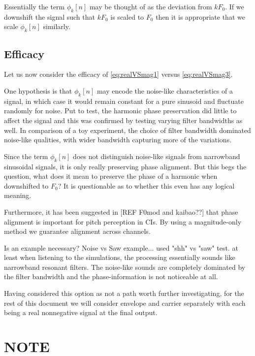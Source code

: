 \documentclass [11pt, proquest] {uwthesis}[2015/03/03]
\begin{document}
Essentially the term $\phi_k[n]$ may be thought of as the deviation from $kF_0$.  If we downshift the signal such that $kF_0$ is scaled to $F_0$ then it is appropriate that we scale $\phi_k[n]$ similarly.

\subsection{Efficacy}

Let us now consider the efficacy of \ref{eq:realVSmag1} versus  \ref{eq:realVSmag3}.

One hypothesis is that $\phi_k[n]$ may encode the noise-like characteristics of a signal, in which case it would remain constant for a pure sinusoid and fluctuate randomly for noise.  Put to test, the harmonic phase preservation did little to affect the signal and this was confirmed by testing varying filter bandwidths as well.  In comparison of a toy experiment, the choice of filter bandwidth dominated noise-like qualities, with wider bandwidth capturing more of the variations.

Since the term $\phi_k[n]$ does not distinguish noise-like signals from narrowband sinusoidal signals, it is only really preserving phase alignment.  But this begs the question, what does it mean to preserve the phase of a harmonic when downshifted to $F_0$?  It is questionable as to whether this even has any logical meaning.


Furthermore, it has been suggested in [REF F0mod and kaibao??] that phase alignment is important for pitch perception in CIs.  By using a magnitude-only method we guarantee alignment across channels.

Is an example necessary? Noise vs Saw example...
used "shh" vs "saw" test.  at least when listening to the simulations, the processing essentially sounds like narrowband resonant filters.  The noise-like sounds are completely dominated by the filter bandwidth and the phase-information is not noticeable at all.

Having considered this option as not a path worth further investigating, for the rest of this document we will consider envelope and carrier separately with each being a real nonnegative signal at the final output.

\section{NOTE}
\end{document}
